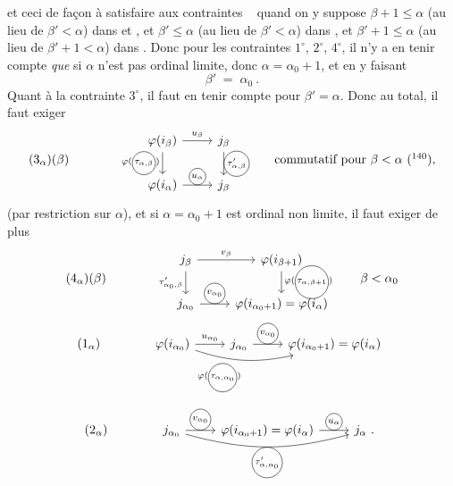et ceci de façon à satisfaire aux contraintes \,\,\, quand on y suppose $\beta+1\leqslant\alpha$ (au lieu de $\beta'<\alpha$) dans  et , et $\beta'\leqslant\alpha$ (au lieu de $\beta'<\alpha$) dans , et $\beta'+1\leqslant\alpha$ (au lieu de $\beta'+1<\alpha$) dans . Donc pour les contraintes $1^\circ$, $2^\circ$, $4^\circ$, il n'y a en tenir compte \textit{que} si $\alpha$ n'est pas ordinal limite, donc $\alpha=\alpha_0+1$, et en y faisant %
\[
\beta' \;=\; \alpha_0\ .
\]
Quant à la contrainte $3^\circ$, il faut en
tenir compte pour $\beta'=\alpha$. Donc au total, il faut exiger
\[
(3_\alpha)(\beta)\qquad\qquad
\begin{tikzcd}
\varphi(i_\beta) \arrow[r, "u_\beta"] \arrow[d, "\varphi(\circled{$\tau_{\alpha,\beta}$})"'] & j_\beta \arrow[d, "\tau'_{\alpha,\beta}" {draw, circle, inner sep=1pt}] \\
\varphi(i_\alpha) \arrow[r, "u_\alpha" {draw, circle, inner sep=1pt}] & j_\beta %
\end{tikzcd}
\qquad \text{commutatif pour } \beta<\alpha\ (\footnotemark[140]),
\]
(par restriction sur $\alpha$), et si $\alpha=\alpha_0+1$ est ordinal non limite, il faut exiger de plus
\[
(4_\alpha)(\beta)\qquad\qquad
\begin{tikzcd}
j_\beta \arrow[r, "v_\beta"] \arrow[d, "\tau'_{\alpha_0,\beta}"'] & \varphi(i_{\beta+1}) \arrow[d, "\varphi(\circled{$\tau_{\alpha,\beta+1}$})"] \\
j_{\alpha_0} \arrow[r, "v_{\alpha_0}" {draw, circle, inner sep=1pt}] & \varphi(i_{\alpha_0+1})=\varphi(i_\alpha)
\end{tikzcd}
\qquad \beta<\alpha_0
\]
\[
(1_\alpha)\qquad\qquad
\begin{tikzcd}
\varphi(i_{\alpha_0}) \arrow[r, "u_{\alpha_0}"] \arrow[rr, bend right=15, "\varphi(\circled{$\tau_{\alpha,\alpha_0}$})"'] & j_{\alpha_0} \arrow[r, "v_{\alpha_0}" {draw, circle, inner sep=1pt}] & \varphi(i_{\alpha_0+1})=\varphi(i_\alpha)
\end{tikzcd}
\]

\[
(2_\alpha)\qquad\qquad
\begin{tikzcd}
j_{\alpha_0} \arrow[r, "v_{\alpha_0}" {draw, circle, inner sep=1pt}] \arrow[rr, bend right=15, "\tau'_{\alpha,\alpha_0}"' {draw, circle, inner sep=1pt}] & \varphi(i_{\alpha_0+1})=\varphi(i_\alpha) \arrow[r, "u_\alpha" {draw, circle, inner sep=1pt}] & j_\alpha\ .
\end{tikzcd}
\]

